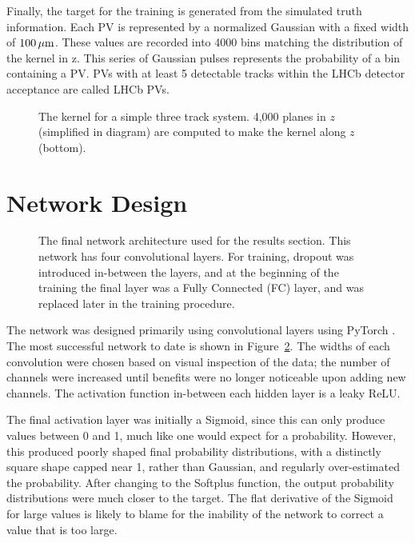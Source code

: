 \documentclass[a4paper]{jpconf}
\begin{document}
Finally, the target for the training is generated from the simulated truth information. Each PV is represented by a normalized Gaussian with a fixed width of $\unit[100]{\mu m}$. These values are recorded into 4000 bins matching the distribution of the kernel in z. This series of Gaussian pulses represents the probability of a bin containing a PV.  %
PVs with at least 5 detectable tracks within the LHCb detector acceptance are called LHCb PVs.

\begin{figure}
	\centering
	
	\caption{The kernel for a simple three track system. 4,000 planes in $z$ (simplified in diagram) are computed to make the kernel along $z$ (bottom).}
	\label{fig:kernel}
\end{figure}

\section{Network Design}

\begin{figure}
	\centering
	
	\caption{The final network architecture used for the results section. This network has four convolutional layers. For training, dropout was introduced in-between the layers, and at the beginning of the training the final layer was a Fully Connected (FC) layer, and was replaced later in the training procedure.}
	\label{fig:nnarch}
\end{figure}

The network was designed primarily using convolutional layers using PyTorch \cite{paszke2017automatic}. The most successful network to date is shown in Figure~\ref{fig:nnarch}. The widths of each convolution were chosen based on visual inspection of the data; the number of channels were increased until benefits were no longer noticeable upon adding new channels. The activation function in-between each hidden layer is a leaky ReLU.

The final activation layer was initially a Sigmoid, since this can only produce values between 0 and 1, much like one would expect for a probability. However, this produced poorly shaped final probability distributions, with a distinctly square shape capped near 1, rather than Gaussian, and regularly over-estimated the probability. After changing to the Softplus function, the output probability distributions were much closer to the target. The flat derivative of the Sigmoid for large values is likely to blame for the inability of the network to correct a value that is too large.
\end{document}
